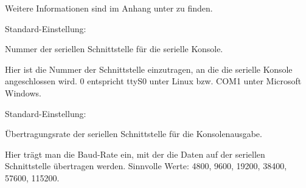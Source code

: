 \begin{description}

    Weitere Informationen sind im Anhang unter
     zu finden.


  
    Standard-Einstellung: 
    
    {Nummer der seriellen Schnittstelle für die serielle Konsole.

    Hier ist die Nummer der Schnittstelle einzutragen, an die die serielle
    Konsole angeschlossen wird.
    0 entspricht ttyS0 unter Linux bzw. COM1 unter Microsoft Windows.}


    
    Standard-Einstellung: 
    
    {Übertragungsrate der seriellen Schnittstelle für die Konsolenausgabe.

    Hier trägt man die Baud-Rate ein, mit der die Daten auf der
    seriellen Schnittstelle übertragen werden.  Sinnvolle Werte: 4800,
    9600, 19200, 38400, 57600, 115200.}

\end{description}
